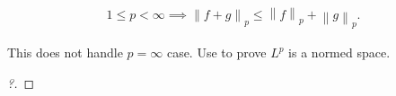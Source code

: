 \begin{proposition}

\begin{align*}  
1\leq p < \infty \implies {\left\lVert {f+g} \right\rVert}_{p} \leq {\left\lVert {f} \right\rVert}_{p}+ {\left\lVert {g} \right\rVert}_{p}
.\end{align*}

\end{proposition}

\begin{remark}

This does not handle \(p=\infty\) case. Use to prove \(L^p\) is a normed
space.

\end{remark}

\begin{proof}[?]

\envlist


\end{proof}
